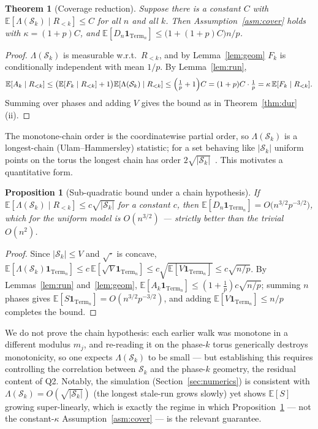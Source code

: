 \documentclass[11pt]{article}
\newtheorem{theorem}{Theorem}
\newtheorem{proposition}{Proposition}
\theoremstyle{definition}
\theoremstyle{remark}
\newcommand{\Term}{\mathrm{Term}}
\newcommand{\E}{\mathbb{E}}
\begin{document}
\begin{theorem}[Coverage reduction]\label{thm:reduce}
Suppose there is a constant $C$ with $\E[\Lambda(\mathcal S_k) \mid R_{<k}] \le C$ for all $n$ and all $k$. Then
Assumption~\ref{asm:cover} holds with $\kappa = (1 + p)C$, and $\E[D_n \mathbf 1_{\Term_n}] \le \bigl(1 + (1 + p)C\bigr) n/p$.
\end{theorem}
\begin{proof}
$\Lambda(\mathcal S_k)$ is measurable w.r.t.\ $R_{<k}$, and by Lemma~\ref{lem:geom} $F_k$ is conditionally independent with
mean $1/p$. By Lemma~\ref{lem:run},
\[
\E[A_k \mid R_{<k}] \le \bigl(\E[F_k \mid R_{<k}] + 1\bigr)\E[\Lambda(\mathcal S_k) \mid R_{<k}]
\le \Bigl(\tfrac1p + 1\Bigr) C = (1 + p) C \cdot \tfrac1p = \kappa\, \E[F_k \mid R_{<k}].
\]
Summing over phases and adding $V$ gives the bound as in Theorem~\ref{thm:dur}(ii).
\end{proof}

The monotone-chain order is the coordinatewise partial order, so $\Lambda(\mathcal S_k)$ is a longest-chain
(Ulam--Hammersley) statistic; for a set behaving like $|\mathcal S_k|$ uniform points on the torus the longest chain has
order $2\sqrt{|\mathcal S_k|}$~\cite{AldousDiaconis,Romik}. This motivates a quantitative form.

\begin{proposition}[Sub-quadratic bound under a chain hypothesis]\label{prop:subquad}
If $\E[\Lambda(\mathcal S_k) \mid R_{<k}] \le c\sqrt{|\mathcal S_k|}$ for a constant $c$, then
$\E[D_n \mathbf 1_{\Term_n}] = O\!\bigl(n^{3/2} p^{-3/2}\bigr)$, which for the uniform model is $O(n^{3/2})$ --- strictly
better than the trivial $O(n^2)$.
\end{proposition}
\begin{proof}
Since $|\mathcal S_k| \le V$ and $\sqrt\cdot$ is concave,
$\E[\Lambda(\mathcal S_k)\mathbf 1_{\Term_n}] \le c\,\E[\sqrt V \mathbf 1_{\Term_n}] \le c\sqrt{\E[V \mathbf 1_{\Term_n}]}
\le c\sqrt{n/p}$. By Lemmas~\ref{lem:run} and~\ref{lem:geom}, $\E[A_k \mathbf 1_{\Term_n}] \le (1 + \tfrac1p) c \sqrt{n/p}$;
summing $n$ phases gives $\E[S \mathbf 1_{\Term_n}] = O(n^{3/2} p^{-3/2})$, and adding $\E[V \mathbf 1_{\Term_n}] \le n/p$
completes the bound.
\end{proof}

We do not prove the chain hypothesis: each earlier walk was monotone in a different modulus $m_j$, and re-reading it on the
phase-$k$ torus generically destroys monotonicity, so one expects $\Lambda(\mathcal S_k)$ to be small --- but establishing
this requires controlling the correlation between $\mathcal S_k$ and the phase-$k$ geometry, the residual content of Q2.
Notably, the simulation (Section~\ref{sec:numerics}) is consistent with $\Lambda(\mathcal S_k) = O(\sqrt{|\mathcal S_k|})$
(the longest stale-run grows slowly) yet shows $\E[S]$ growing super-linearly, which is exactly the regime in which
Proposition~\ref{prop:subquad} --- not the constant-$\kappa$ Assumption~\ref{asm:cover} --- is the relevant guarantee.
\end{document}
